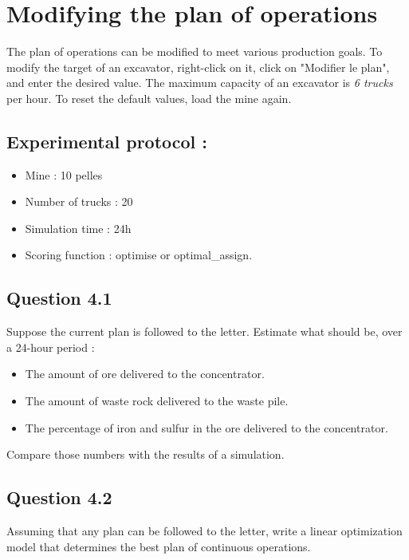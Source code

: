 \documentclass[letterpaper,12pt]{article}
\begin{document}
	
	
	
	\section{Modifying the plan of operations}
	
	The plan of operations can be modified to meet various production goals. To modify the target of an excavator, right-click on it, click on "Modifier le plan", and enter the desired value. The maximum capacity of an excavator is \emph{6 trucks} per hour. To reset the default values, load the mine again.

	
	
	
	\subsection*{Experimental protocol : }
	
	\begin{itemize}
		\item Mine : 10 pelles
		\item Number of trucks : 20
		\item Simulation time : 24h
		\item Scoring function : optimise or optimal\_assign.
	\end{itemize}
	
	\subsection*{Question 4.1}
	Suppose the current plan is followed to the letter. Estimate what should be, over a 24-hour period :
	
	\begin{itemize}
		\item The amount of ore delivered to the concentrator.
		\item The amount of waste rock delivered to the waste pile.
		\item The percentage of iron and sulfur in the ore delivered to the concentrator.
	\end{itemize}
	
	Compare those numbers with the results of a simulation.

	
	\subsection*{Question 4.2}
	Assuming that any plan can be followed to the letter, write a linear optimization model that determines the best plan of continuous operations.
	
\end{document}
